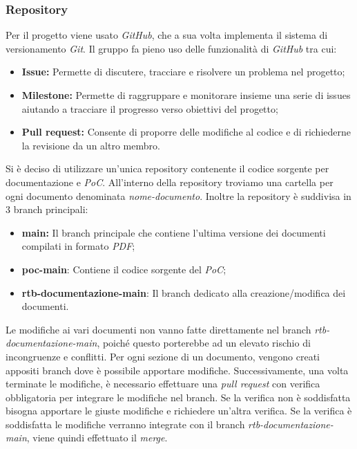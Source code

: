 \subsubsection{Repository}
    Per il progetto viene usato \emph{GitHub}, che a sua volta implementa il sistema di versionamento 
    \emph{Git}. Il gruppo fa pieno uso delle funzionalità di \emph{GitHub} tra cui:
    \begin{itemize}
        \item \textbf{Issue:} Permette di discutere, tracciare e risolvere un problema nel progetto;
        \item \textbf{Milestone:} Permette di raggruppare e monitorare insieme una serie di issues aiutando a tracciare il progresso verso obiettivi del progetto;
        \item \textbf{Pull request:} Consente di proporre delle modifiche al codice e di richiederne la revisione da un altro membro.
    \end{itemize}
    Si è deciso di utilizzare un'unica repository contenente il codice sorgente per documentazione e \emph{PoC}.
    All'interno della repository troviamo una cartella per ogni documento denominata \emph{nome-documento}. Inoltre la
    repository è suddivisa in 3 branch principali:
    \begin{itemize}
        \item \textbf{main:} Il branch principale che contiene l'ultima versione dei documenti compilati in formato \emph{PDF};
        \item \textbf{poc-main}: Contiene il codice sorgente del \emph{PoC};
        \item \textbf{rtb-documentazione-main}: Il branch dedicato alla creazione/modifica dei documenti.
    \end{itemize}
    Le modifiche ai vari documenti non vanno fatte direttamente nel branch \emph{rtb-documentazione-main},
    poiché questo porterebbe ad un elevato rischio di incongruenze e conflitti. Per ogni sezione di un documento, vengono
    creati appositi branch dove è possibile apportare modifiche. Successivamente, una volta terminate le modifiche, è necessario 
    effettuare una \emph{pull request} con verifica obbligatoria per integrare le modifiche nel branch. Se la verifica non è
    soddisfatta bisogna apportare le giuste modifiche e richiedere un'altra verifica. Se la verifica è
    soddisfatta le modifiche verranno integrate con il branch \emph{rtb-documentazione-main}, viene quindi effettuato il \emph{merge}. 